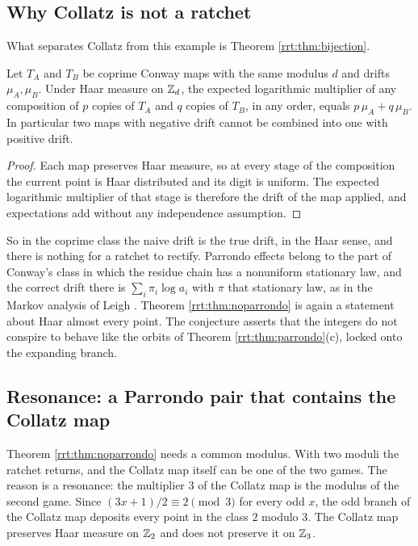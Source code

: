 \subsection{Why Collatz is not a ratchet}
What separates Collatz from this example is Theorem \ref{rrt:thm:bijection}.

\begin{theorem}\label{rrt:thm:noparrondo}
Let $T_A$ and $T_B$ be coprime Conway maps with the same modulus $d$ and drifts $\mu_A,\mu_B$. Under Haar measure on $\mathbb{Z}_d$, the expected logarithmic multiplier of any composition of $p$ copies of $T_A$ and $q$ copies of $T_B$, in any order, equals $p\,\mu_A+q\,\mu_B$. In particular two maps with negative drift cannot be combined into one with positive drift.
\end{theorem}

\begin{proof}
Each map preserves Haar measure, so at every stage of the composition the current point is Haar distributed and its digit is uniform. The expected logarithmic multiplier of that stage is therefore the drift of the map applied, and expectations add without any independence assumption.
\end{proof}

So in the coprime class the naive drift is the true drift, in the Haar sense, and there is nothing for a ratchet to rectify. Parrondo effects belong to the part of Conway's class in which the residue chain has a nonuniform stationary law, and the correct drift there is $\sum_i\pi_i\log a_i$ with $\pi$ that stationary law, as in the Markov analysis of Leigh \cite{leigh1986}. Theorem \ref{rrt:thm:noparrondo} is again a statement about Haar almost every point. The conjecture asserts that the integers do not conspire to behave like the orbits of Theorem \ref{rrt:thm:parrondo}(c), locked onto the expanding branch.

\subsection{Resonance: a Parrondo pair that contains the Collatz map}\label{rrt:sec:resonance}
Theorem \ref{rrt:thm:noparrondo} needs a common modulus. With two moduli the ratchet returns, and the Collatz map itself can be one of the two games. The reason is a resonance: the multiplier $3$ of the Collatz map is the modulus of the second game. Since $(3x+1)/2\equiv 2 \pmod 3$ for every odd $x$, the odd branch of the Collatz map deposits every point in the class $2$ modulo $3$. The Collatz map preserves Haar measure on $\mathbb{Z}_2$ and does not preserve it on $\mathbb{Z}_3$.

